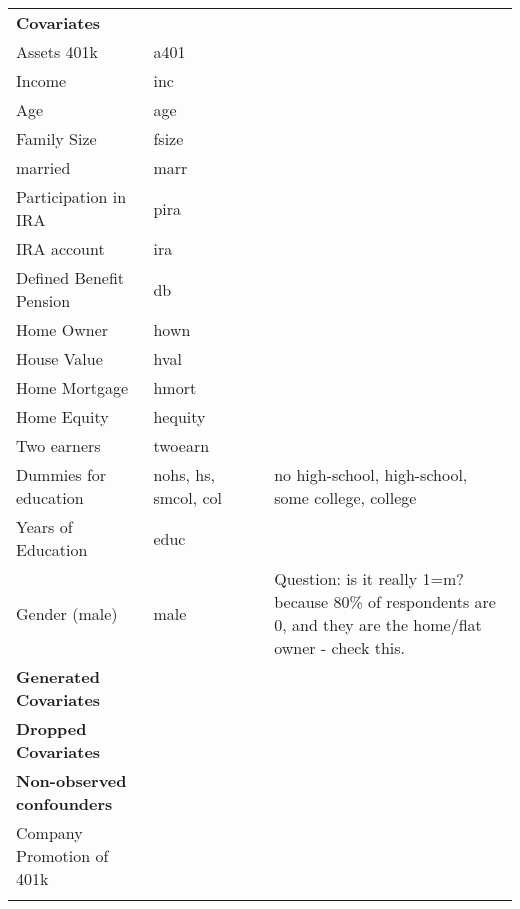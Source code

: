 \documentclass[12pt,a4paper]{article}
\begin{document}
\begin{landscape}
\begin{singlespace}
\begin{ThreePartTable}
\begin{longtable}{l C{2cm} C{4cm} C{6cm} C{6cm} }
					\midrule
					\textbf{Covariates} & & & & \\
					Assets 401k & a401 & & & \\
					Income & inc & & &  \\
					Age & age & & & \\
					Family Size & fsize & & & \\
					married & marr & & & \\
					Participation in IRA & pira & & & \\
					IRA account & ira & & & \\
					Defined Benefit Pension & db & & & \\
					Home Owner & hown & & & \\
					House Value & hval & & & \\
					Home Mortgage & hmort & & & \\
					Home Equity & hequity & & & \\
					Two earners & twoearn & & & \\
					Dummies for education & nohs, hs, smcol, col & & & no high-school, high-school, some college, college\\
					Years of Education & educ & & & \\
					Gender (male) & male & & & Question: is it really 1=m? because 80\% of respondents are 0, and they are the home/flat owner - check this. \\
					\midrule
					\textbf{Generated Covariates} & & & & \\
					\midrule
					\textbf{Dropped Covariates} & & & & \\
					\midrule
					\textbf{Non-observed confounders} & & & & \\
					Company Promotion of 401k & & & & \\
					\bottomrule
				\insertTableNotes \\
				\end{longtable} 

				
			\end{ThreePartTable}
\end{singlespace} 
\end{landscape}
\end{document}
